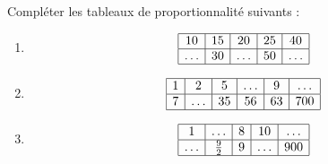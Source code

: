 
\begin{exercice}\label{exosmath-0945}

    Compléter les tableaux de proportionnalité suivants :
    \begin{enumerate}
        \item
            \begin{equation*}
                \begin{array}[]{|c|c|c|c|c|}
                    \hline
                    10&15&20&25&40\\
                    \hline
                    \ldots&30&\ldots&50&\ldots\\
                    \hline
                \end{array}
            \end{equation*}
        \item
            \begin{equation*}
                \begin{array}[]{|c|c|c|c|c|c|}
                    \hline
                     1&2&5&\ldots&9&\ldots\\
                      \hline
                      7&\ldots&35&56&63&700\\ 
                      \hline 
                       \end{array}
                   \end{equation*}
               \item
                   \begin{equation*}
                       \begin{array}[]{|c|c|c|c|c|}
                           \hline
                           1&\ldots&8&10&\ldots\\
                           \hline
                           \ldots&\frac{ 9 }{2}&9&\ldots&900\\
                           \hline
                       \end{array}
                   \end{equation*}
    \end{enumerate}

\end{exercice}
